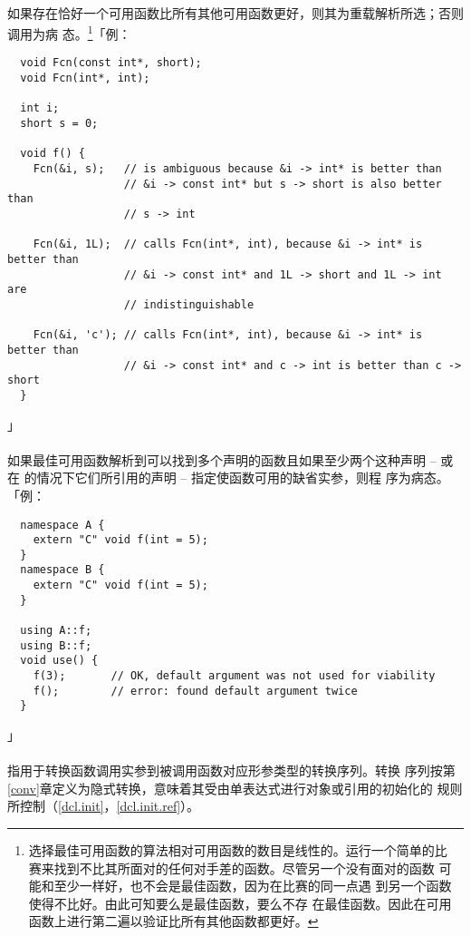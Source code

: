 \egroup %

\paragraph{}
如果存在恰好一个可用函数比所有其他可用函数更好，则其为重载解析所选；否则调用为病
态。\footnote{选择最佳可用函数的算法相对可用函数的数目是线性的。运行一个简单的比
赛来找到不比其所面对的任何对手差的函数。尽管另一个没有面对的函数
可能和至少一样好，也不会是最佳函数，因为在比赛的同一点遇
到另一个函数使得不比好。由此可知要么是最佳函数，要么不存
在最佳函数。因此在可用函数上进行第二遍以验证比所有其他函数都更好。}「例：
\begin{lstlisting}
  void Fcn(const int*, short);
  void Fcn(int*, int);

  int i;
  short s = 0;

  void f() {
    Fcn(&i, s);   // is ambiguous because &i -> int* is better than
                  // &i -> const int* but s -> short is also better than
                  // s -> int

    Fcn(&i, 1L);  // calls Fcn(int*, int), because &i -> int* is better than
                  // &i -> const int* and 1L -> short and 1L -> int are
                  // indistinguishable

    Fcn(&i, 'c'); // calls Fcn(int*, int), because &i -> int* is better than
                  // &i -> const int* and c -> int is better than c -> short
  }
\end{lstlisting}」

\paragraph{}
如果最佳可用函数解析到可以找到多个声明的函数且如果至少两个这种声明 -- 或在
的情况下它们所引用的声明 -- 指定使函数可用的缺省实参，则程
序为病态。「例：
\begin{lstlisting}
  namespace A {
    extern "C" void f(int = 5);
  }
  namespace B {
    extern "C" void f(int = 5);
  }

  using A::f;
  using B::f;
  void use() {
    f(3);       // OK, default argument was not used for viability
    f();        // error: found default argument twice
  }
\end{lstlisting}」

\paragraph{}
指用于转换函数调用实参到被调用函数对应形参类型的转换序列。转换
序列按第\ref{conv}章定义为隐式转换，意味着其受由单表达式进行对象或引用的初始化的
规则所控制（\ref{dcl.init}，\ref{dcl.init.ref}）。

